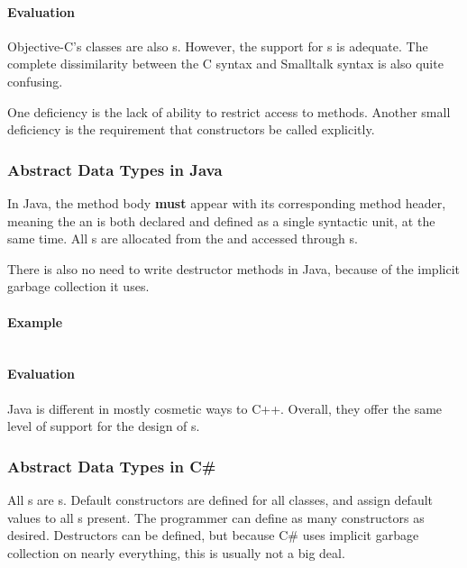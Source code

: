 \paragraph{Evaluation}\label{par:Objective_C_Abstract_Data_Type_Evaluation}
Objective-C's classes are also s.
However, the support for s is adequate.
The complete dissimilarity between the C syntax and Smalltalk syntax is also quite confusing.

One deficiency is the lack of ability to restrict access to methods.
Another small deficiency is the requirement that constructors be called explicitly.

\subsubsection{Abstract Data Types in Java}\label{subsubsec:Abstract_Data_Types_Java}
In Java, the method body \textbf{must} appear with its corresponding method header, meaning the an  is both declared and defined as a single syntactic unit, at the same time.
All s are allocated from the  and accessed through s.

There is also no need to write destructor methods in Java, because of the implicit garbage collection it uses.

\paragraph{Example}\label{par:Java_Abstract_Data_Type_Example}
\inputminted[frame=lines,linenos]{java}{./EDAP05-Concepts_Programming_Languages-Sections/Code/Class_Example-Stack-Java.java}

\paragraph{Evaluation}\label{par:Java_Abstract_Data_Type_Evaluation}
Java is different in mostly cosmetic ways to C++.
Overall, they offer the same level of support for the design of s.

\subsubsection{Abstract Data Types in C\#}\label{subsubsec:Abstract_Data_Types_CSharp}
All s are s.
Default constructors are defined for all classes, and assign default values to all  s present.
The programmer can define as many constructors as desired.
Destructors can be defined, but because C\# uses implicit garbage collection on nearly everything, this is usually not a big deal.

